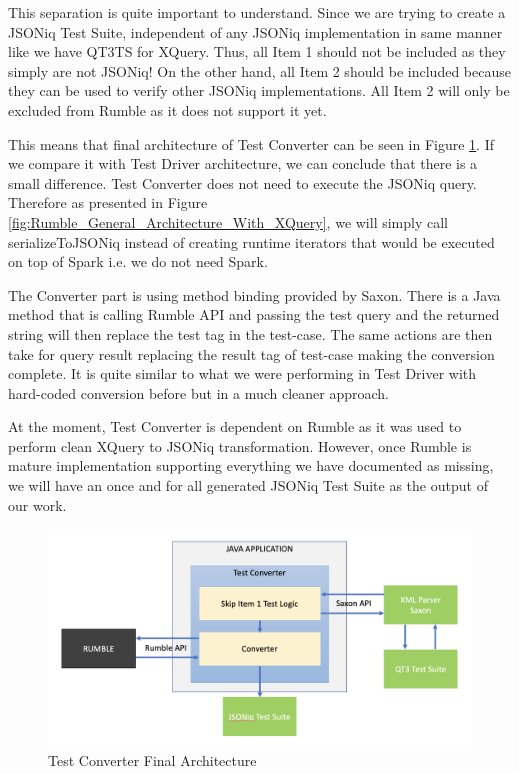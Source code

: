 This separation is quite important to understand. Since we are trying to create a JSONiq Test Suite, independent of any JSONiq implementation in same manner like we have QT3TS for XQuery. Thus, all Item 1 should not be included as they simply are not JSONiq! On the other hand, all Item 2 should be included because they can be used to verify other JSONiq implementations. All Item 2 will only be excluded from Rumble as it does not support it yet.

This means that final architecture of Test Converter can be seen in Figure \ref{fig:test_converter_final_architecture.png}. If we compare it with Test Driver architecture, we can conclude that there is a small difference. Test Converter does not need to execute the JSONiq query. Therefore as presented in Figure \ref{fig:Rumble_General_Architecture_With_XQuery}, we will simply call serializeToJSONiq instead of creating runtime iterators that would be executed on top of Spark i.e. we do not need Spark. 

The Converter part is using method binding provided by Saxon. There is a Java method that is calling Rumble API and passing the test query and the returned string will then replace the test tag in the test-case. The same actions are then take for query result replacing the result tag of test-case making the conversion complete. It is quite similar to what we were performing in Test Driver with hard-coded conversion before but in a much cleaner approach.

At the moment, Test Converter is dependent on Rumble as it was used to perform clean XQuery to JSONiq transformation. However, once Rumble is mature implementation supporting everything we have documented as missing, we will have an once and for all generated JSONiq Test Suite as the output of our work.

\begin{figure}[h!]
	\includegraphics[width=\linewidth]{test_converter_final_architecture.png}
	\vspace*{-5mm}
	\caption{Test Converter Final Architecture}
	\label{fig:test_converter_final_architecture.png}
\end{figure}

